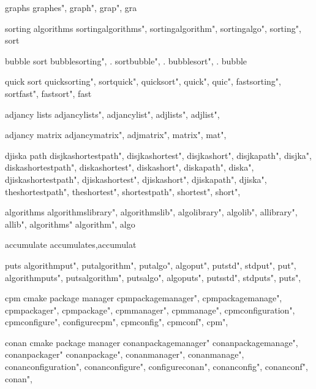          graphs 
        graphes", 
        graph", 
        grap", 
        gra
        
         sorting algorithms 
        sortingalgorithms",  
        sortingalgorithm",  
        sortingalgo",  
        sorting",  
        sort
        
         bubble sort 
        bubblesorting", . 
        sortbubble", . 
        bubblesort", . 
        bubble
        
         quick sort 
        quicksorting",  
        sortquick",  
        quicksort",  
        quick",  
        quic",  
        fastsorting",  
        sortfast",  
        fastsort",  
        fast
        
         adjancy lists
        adjancylists",  
        adjancylist",  
        adjlists",  
        adjlist",  
        
         adjancy matrix 
        adjancymatrix",  
        adjmatrix",  
        matrix",  
        mat",  
        
         djiska path 
        disjkashortestpath",  
        disjkashortest",  
        disjkashort",  
        disjkapath",  
        disjka",  
        diskashortestpath",  
        diskashortest",  
        diskashort",  
        diskapath",  
        diska",  
        djiskashortestpath",  
        djiskashortest",  
        djiskashort",  
        djiskapath",  
        djiska",  
        theshortestpath",  
        theshortest",  
        shortestpath",  
        shortest",  
        short",  
        
         algorithms 
        algorithmslibrary", 
        algorithmslib",
        algolibrary",
        algolib",
        allibrary",
        allib",
        algorithms"
        algorithm",
        algo
        
         accumulate
        accumulates,accumulat
        
         puts 
        algorithmput",  
        putalgorithm",  
        putalgo",  
        algoput",  
        putstd",  
        stdput",  
        put",  
        algorithmputs",  
        putsalgorithm",  
        putsalgo",  
        algoputs",  
        putsstd",  
        stdputs",  
        puts",  
        
         cpm cmake package manager
        cpmpackagemanager",  
        cpmpackagemanage",  
        cpmpackager",  
        cpmpackage",  
        cpmmanager",  
        cpmmanage",  
        cpmconfiguration",  
        cpmconfigure",  
        configurecpm",  
        cpmconfig",  
        cpmconf",  
        cpm",  
        
         
         conan cmake package manager
        conanpackagemanager" 
        conanpackagemanage",
        conanpackager"
        conanpackage", 
        conanmanager", 
        conanmanage",
        conanconfiguration",
        conanconfigure",
        configureconan",
        conanconfig",
        conanconf",
        conan",
